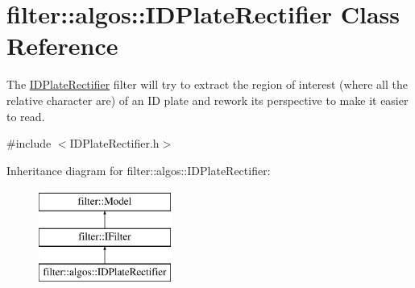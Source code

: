 \hypertarget{classfilter_1_1algos_1_1_i_d_plate_rectifier}{}\section{filter\+:\+:algos\+:\+:I\+D\+Plate\+Rectifier Class Reference}
\label{classfilter_1_1algos_1_1_i_d_plate_rectifier}


The \hyperlink{classfilter_1_1algos_1_1_i_d_plate_rectifier}{I\+D\+Plate\+Rectifier} filter will try to extract the region of interest (where all the relative character are) of an ID plate and rework its perspective to make it easier to read.  




{\ttfamily \#include $<$I\+D\+Plate\+Rectifier.\+h$>$}

Inheritance diagram for filter\+:\+:algos\+:\+:I\+D\+Plate\+Rectifier\+:\begin{figure}[H]
\begin{center}
\leavevmode
\includegraphics[height=3.000000cm]{d5/daf/classfilter_1_1algos_1_1_i_d_plate_rectifier}
\end{center}
\end{figure}
